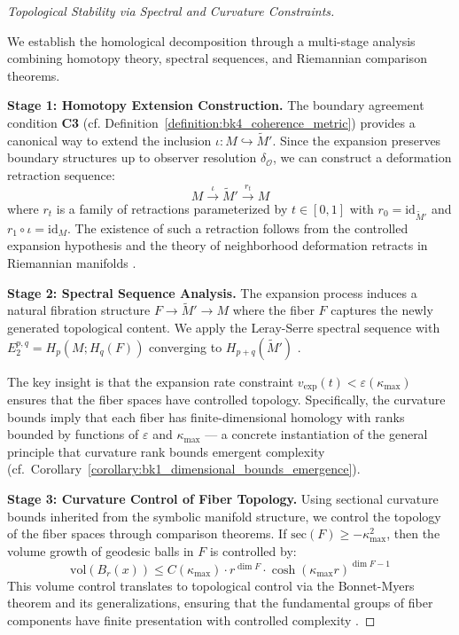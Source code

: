 \begin{proof}[Topological Stability via Spectral and Curvature Constraints]
\label{proof:bk4_topological_stability_via_spectral_and_curvature_constraints}
\leavevmode

We establish the homological decomposition through a multi-stage analysis combining homotopy theory, spectral sequences, and Riemannian comparison theorems.

\textbf{Stage 1: Homotopy Extension Construction.} 
The boundary agreement condition \textbf{C3} (cf. Definition~\ref{definition:bk4_coherence_metric}) provides a canonical way to extend the inclusion $\iota: M \hookrightarrow \widetilde{M}'$. Since the expansion preserves boundary structures up to observer resolution $\delta_{\mathcal{O}}$, we can construct a deformation retraction sequence:
\[
M \xrightarrow{\iota} \widetilde{M}' \xrightarrow{r_t} M
\]
where $r_t$ is a family of retractions parameterized by $t \in [0,1]$ with $r_0 = \text{id}_{\widetilde{M}'}$ and $r_1 \circ \iota = \text{id}_M$. The existence of such a retraction follows from the controlled expansion hypothesis and the theory of neighborhood deformation retracts in Riemannian manifolds \cite{hatcher2002algebraic}.

\textbf{Stage 2: Spectral Sequence Analysis.}
The expansion process induces a natural fibration structure $F \to \widetilde{M}' \to M$ where the fiber $F$ captures the newly generated topological content. We apply the Leray-Serre spectral sequence with $E_2^{p,q} = H_p(M; H_q(F))$ converging to $H_{p+q}(\widetilde{M}')$ \cite{mccleary2001user}.

The key insight is that the expansion rate constraint $v_{\text{exp}}(t) < \varepsilon(\kappa_{\max})$ ensures that the fiber spaces have controlled topology. Specifically, the curvature bounds imply that each fiber has finite-dimensional homology with ranks bounded by functions of $\varepsilon$ and $\kappa_{\max}$ --- a concrete instantiation of the general principle that curvature rank bounds emergent complexity (cf.~Corollary~\ref{corollary:bk1_dimensional_bounds_emergence}).

\textbf{Stage 3: Curvature Control of Fiber Topology.}
Using sectional curvature bounds inherited from the symbolic manifold structure, we control the topology of the fiber spaces through comparison theorems. If $\text{sec}(F) \geq -\kappa_{\max}^2$, then the volume growth of geodesic balls in $F$ is controlled by:
\[
\text{vol}(B_r(x)) \leq C(\kappa_{\max}) \cdot r^{\dim F} \cdot \cosh(\kappa_{\max} r)^{\dim F - 1}
\]
This volume control translates to topological control via the Bonnet-Myers theorem and its generalizations, ensuring that the fundamental groups of fiber components have finite presentation with controlled complexity \cite{petersen2006riemannian}.


\end{proof}
